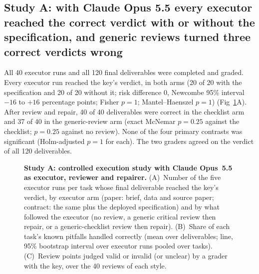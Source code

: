 \subsection*{Study A: with Claude Opus 5.5 every executor reached the correct verdict with or without the specification, and generic reviews turned three correct verdicts wrong}
All 40 executor runs and all 120 final deliverables were completed and
graded. Every executor run reached the key's verdict, in both arms (20 of
20 with the specification and 20 of 20 without it; risk difference 0,
Newcombe 95\% interval $-16$ to $+16$ percentage points; Fisher
$p = 1$; Mantel--Haenszel $p = 1$) (Fig~\ref{fig:studyA}A). After review
and repair, 40 of 40 deliverables were correct in the checklist arm and 37
of 40 in the generic-review arm (exact McNemar $p = 0.25$ against the
checklist; $p = 0.25$ against no review). None of the four primary
contrasts was significant (Holm-adjusted $p = 1$ for each). The two
graders agreed on the verdict of all 120 deliverables.

\begin{figure}[H]
\caption{\textbf{Study A: controlled execution study with Claude Opus~5.5
as executor, reviewer and repairer.} (A)~Number of the five executor runs
per task whose final deliverable reached the key's verdict, by executor
arm (paper: brief, data and source paper; contract: the same plus the
deployed specification) and by what followed the executor (no review, a
generic critical review then repair, or a generic-checklist review then
repair). (B)~Share of each task's known pitfalls handled correctly (mean
over deliverables; line, 95\% bootstrap interval over executor runs
pooled over tasks).
(C)~Review points judged valid or invalid (or unclear) by a grader with
the key, over the 40 reviews of each style.}
\label{fig:studyA}
\end{figure}

